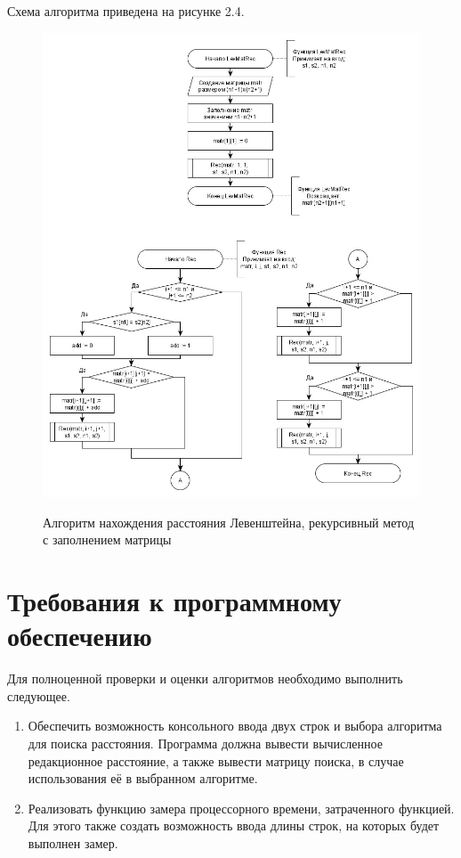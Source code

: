 \documentclass[10pt,a4paper]{report}
\begin{document}
	Схема алгоритма приведена на рисунке 2.4.
	\begin{figure}[h]
		\begin{center}
			{\includegraphics[scale = 0.55]{Lev_mat_rec}}
			\caption{Алгоритм нахождения расстояния Левенштейна, рекурсивный метод с заполнением матрицы}
		\end{center}
	\end{figure}
	
	\section{Требования к программному обеспечению}
	Для полноценной проверки и оценки алгоритмов необходимо выполнить следующее.
	\begin{enumerate}
		\item Обеспечить возможность консольного ввода двух строк и выбора алгоритма для поиска расстояния. Программа должна вывести вычисленное редакционное расстояние, а также вывести матрицу поиска, в случае использования её в выбранном алгоритме.
		\item Реализовать функцию замера процессорного времени, затраченного функцией. Для этого также создать возможность ввода длины строк, на которых будет выполнен замер.
	\end{enumerate}
	
\end{document}
